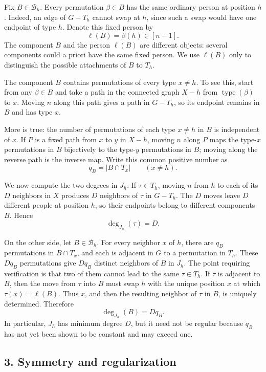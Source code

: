 \documentclass[11pt]{article}
\begin{document}
Fix \(B\in\mathcal B_h\). Every permutation \(\beta\in B\) has the same ordinary person at position \(h\). Indeed, an edge of \(G-T_h\) cannot swap at \(h\), since such a swap would have one endpoint of type \(h\). Denote this fixed person by
\[
\ell(B)=\beta(h)\in[n-1].
\]
The component \(B\) and the person \(\ell(B)\) are different objects: several components could a priori have the same fixed person. We use \(\ell(B)\) only to distinguish the possible attachments of \(B\) to \(T_h\).

The component \(B\) contains permutations of every type \(x\neq h\). To see this, start from any \(\beta\in B\) and take a path in the connected graph \(X-h\) from \(\operatorname{type}(\beta)\) to \(x\). Moving \(n\) along this path gives a path in \(G-T_h\), so its endpoint remains in \(B\) and has type \(x\).

More is true: the number of permutations of each type \(x\neq h\) in \(B\) is independent of \(x\). If \(P\) is a fixed path from \(x\) to \(y\) in \(X-h\), moving \(n\) along \(P\) maps the type-\(x\) permutations in \(B\) bijectively to the type-\(y\) permutations in \(B\); moving along the reverse path is the inverse map. Write this common positive number as
\[
q_B=|B\cap T_x|\qquad(x\neq h).\tag{2}
\]

We now compute the two degrees in \(J_h\). If \(\tau\in T_h\), moving \(n\) from \(h\) to each of its \(D\) neighbors in \(X\) produces \(D\) neighbors of \(\tau\) in \(G-T_h\). The \(D\) moves leave \(D\) different people at position \(h\), so their endpoints belong to different components \(B\). Hence
\[
\deg_{J_h}(\tau)=D.\tag{3}
\]

On the other side, let \(B\in\mathcal B_h\). For every neighbor \(x\) of \(h\), there are \(q_B\) permutations in \(B\cap T_x\), and each is adjacent in \(G\) to a permutation in \(T_h\). These \(Dq_B\) permutations give \(Dq_B\) distinct neighbors of \(B\) in \(J_h\). The point requiring verification is that two of them cannot lead to the same \(\tau\in T_h\). If \(\tau\) is adjacent to \(B\), then the move from \(\tau\) into \(B\) must swap \(h\) with the unique position \(x\) at which \(\tau(x)=\ell(B)\). Thus \(x\), and then the resulting neighbor of \(\tau\) in \(B\), is uniquely determined. Therefore
\[
\deg_{J_h}(B)=Dq_B.\tag{4}
\]
In particular, \(J_h\) has minimum degree \(D\), but it need not be regular because \(q_B\) has not yet been shown to be constant and may exceed one.

\subsection*{3. Symmetry and regularization}
\end{document}
